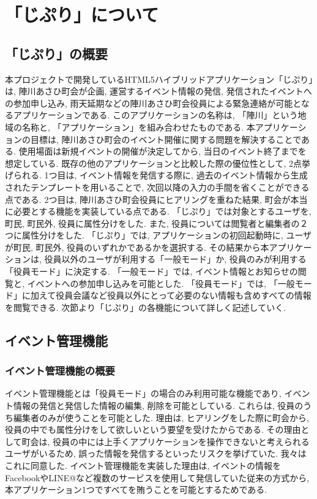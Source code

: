 \chapter{「じぷり」について}

\section{「じぷり」の概要}%
本プロジェクトで開発しているHTML5ハイブリッドアプリケーション「じぷり」は, 陣川あさひ町会が企画, 運営するイベント情報の発信, 発信されたイベントへの参加申し込み, 雨天延期などの陣川あさひ町会役員による緊急連絡が可能となるアプリケーションである. このアプリケーションの名称は, 「陣川」という地域の名称と, 「アプリケーション」を組み合わせたものである. 本アプリケーションの目標は, 陣川あさひ町会のイベント開催に関する問題を解決することである. 使用場面は新規イベントの開催が決定してから, 当日のイベント終了までを想定している. 既存の他のアプリケーションと比較した際の優位性として, 2点挙げられる. 1つ目は, イベント情報を発信する際に, 過去のイベント情報から生成されたテンプレートを用いることで, 次回以降の入力の手間を省くことができる点である. 2つ目は, 陣川あさひ町会役員にヒアリングを重ねた結果, 町会が本当に必要とする機能を実装している点である. 「じぷり」では対象とするユーザを, 町民, 町民外, 役員に属性分けをした. また, 役員については閲覧者と編集者の２つに属性分けをした. 「じぷり」では, アプリケーションの初回起動時に, ユーザが町民, 町民外, 役員のいずれかであるかを選択する. その結果から本アプリケーションは, 役員以外のユーザが利用する「一般モード」か, 役員のみが利用する「役員モード」に決定する. 「一般モード」では, イベント情報とお知らせの閲覧と, イベントへの参加申し込みを可能とした. 「役員モード」では, 「一般モード」に加えて役員会議など役員以外にとって必要のない情報も含めすべての情報を閲覧できる. 次節より「じぷり」の各機能について詳しく記述していく.

\section{イベント管理機能}%
\subsection{イベント管理機能の概要}%
イベント管理機能とは「役員モード」の場合のみ利用可能な機能であり, イベント情報の発信と発信した情報の編集, 削除を可能としている. これらは, 役員のうち編集者のみが使うことを可能とした. 理由は, ヒアリングをした際に町会から, 役員の中でも属性分けをして欲しいという要望を受けたからである. その理由として町会は, 役員の中には上手くアプリケーションを操作できないと考えられるユーザがいるため, 誤った情報を発信するといったリスクを挙げていた. 我々はこれに同意した. イベント管理機能を実装した理由は, イベントの情報をFacebookやLINE@など複数のサービスを使用して発信していた従来の方式から, 本アプリケーション1つですべてを賄うことを可能とするためである.

